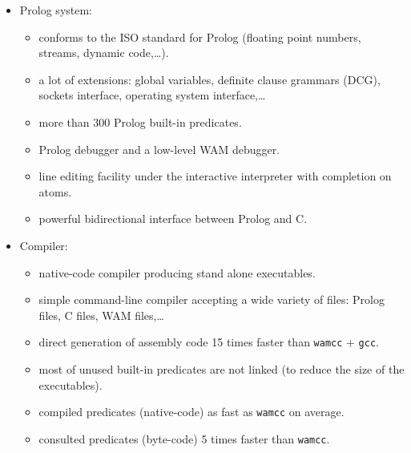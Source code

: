 \begin{itemize}


\item Prolog system:

\begin{itemize}

\item conforms to the ISO standard for Prolog (floating point numbers,
streams, dynamic code,\dots).

\item a lot of extensions: global variables, definite clause grammars (DCG), 
sockets interface, operating system interface,\ldots

\item more than 300 Prolog built-in predicates.

\item Prolog debugger and a low-level WAM debugger.

\item line editing facility under the interactive interpreter with
completion on atoms.

\item powerful bidirectional interface between Prolog and C.

\end{itemize}


\item Compiler:

\begin{itemize}

\item native-code compiler producing stand alone executables.

\item simple command-line compiler accepting a wide variety of files:
Prolog files, C files, WAM files,\ldots

\item direct generation of assembly code 15 times faster than
\texttt{wamcc} + \texttt{gcc}.

\item most of unused built-in predicates are not linked (to reduce the size
of the executables).

\item compiled predicates (native-code) as fast as \texttt{wamcc} on average.

\item consulted predicates (byte-code) 5 times faster than \texttt{wamcc}.

\end{itemize}


\end{itemize}
